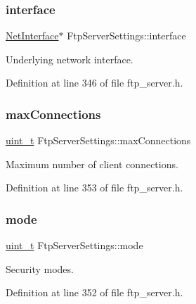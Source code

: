 \subsubsection{\texorpdfstring{interface}{interface}}
{\footnotesize\ttfamily \hyperlink{net_8h_a2234db8911a1148c9159979d8f5e0d6b}{Net\+Interface}$\ast$ Ftp\+Server\+Settings\+::interface}



Underlying network interface. 



Definition at line 346 of file ftp\+\_\+server.\+h.

\mbox{\label{structFtpServerSettings_abd014b45519176c7d629ec4c79b3035a}} 
\subsubsection{\texorpdfstring{max\+Connections}{maxConnections}}
{\footnotesize\ttfamily \hyperlink{compiler__port_8h_a12a1e9b3ce141648783a82445d02b58d}{uint\+\_\+t} Ftp\+Server\+Settings\+::max\+Connections}



Maximum number of client connections. 



Definition at line 353 of file ftp\+\_\+server.\+h.

\mbox{\label{structFtpServerSettings_a1f29e06ca5ab84bca3197e4a1c3f409b}} 
\subsubsection{\texorpdfstring{mode}{mode}}
{\footnotesize\ttfamily \hyperlink{compiler__port_8h_a12a1e9b3ce141648783a82445d02b58d}{uint\+\_\+t} Ftp\+Server\+Settings\+::mode}



Security modes. 



Definition at line 352 of file ftp\+\_\+server.\+h.

\mbox{\label{structFtpServerSettings_a482982b26fa039c6df31e22e61cbdc72}} 
